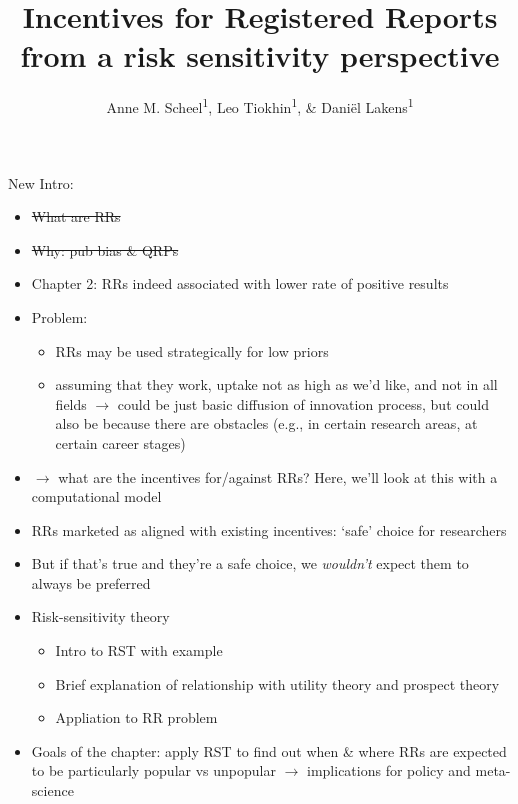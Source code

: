 \documentclass[
  ,man,mask,floatsintext]{apa6}
\title{Incentives for Registered Reports from a risk sensitivity perspective}
\author{Anne M. Scheel\textsuperscript{1}, Leo Tiokhin\textsuperscript{1}, \& Daniël Lakens\textsuperscript{1}}
\date{}
\affiliation{\vspace{0.5cm}\textsuperscript{1} Eindhoven University of Technology}
\providecommand{\tightlist}{%
  \setlength{\itemsep}{0pt}\setlength{\parskip}{0pt}}
\begin{document}
\maketitle

New Intro:

\begin{itemize}
\tightlist
\item
  \sout{What are RRs}
\item
  \sout{Why: pub bias \& QRPs}
\item
  Chapter 2: RRs indeed associated with lower rate of positive results
\item
  Problem:

  \begin{itemize}
  \tightlist
  \item
    RRs may be used strategically for low priors
  \item
    assuming that they work, uptake not as high as we'd like, and not in all fields \(\rightarrow\) could be just basic diffusion of innovation process, but could also be because there are obstacles (e.g., in certain research areas, at certain career stages)
  \end{itemize}
\item
  \(\rightarrow\) what are the incentives for/against RRs? Here, we'll look at this with a computational model
\item
  RRs marketed as aligned with existing incentives: `safe' choice for researchers
\item
  But if that's true and they're a safe choice, we \emph{wouldn't} expect them to always be preferred
\item
  Risk-sensitivity theory

  \begin{itemize}
  \tightlist
  \item
    Intro to RST with example
  \item
    Brief explanation of relationship with utility theory and prospect theory
  \item
    Appliation to RR problem
  \end{itemize}
\item
  Goals of the chapter: apply RST to find out when \& where RRs are expected to be particularly popular vs unpopular \(\rightarrow\) implications for policy and meta-science
\end{itemize}
\end{document}
